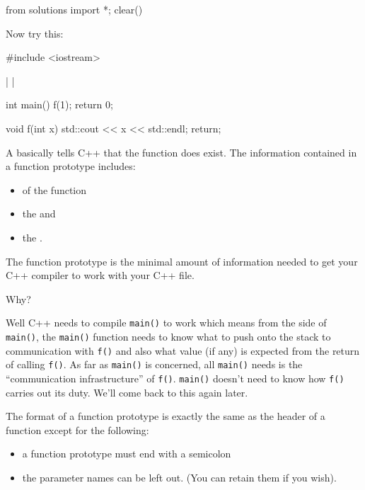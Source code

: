 \begin{python0}
from solutions import *; clear()
\end{python0}


Now try this:

\begin{consolethree}[escapeinside=||]
#include <iostream>

| |

int main()
{
    f(1);
    return 0;
}

void f(int x)
{
    std::cout << x << std::endl;
    return;
}
\end{consolethree}
A  basically tells C++ that the function does exist. The information contained in a function prototype includes:

\begin{itemize}
\item {} of the function
\item the  and
\item the .
\end{itemize}

The function prototype is the minimal amount of information needed to get your C++ compiler to work with your C++ file.

Why?

Well C++ needs to compile \texttt{main()} to work which means from the side of \texttt{main()}, the \texttt{main()} function needs to know what to push onto the stack to communication with \texttt{f()} and also what value (if any) is expected from the return of calling \texttt{f()}. As far as \texttt{main()} is concerned, all \texttt{main()} needs is the ``communication infrastructure'' of \texttt{f()}. \texttt{main()} doesn't need to know how \texttt{f()} carries out its duty. We'll come back to this again later.

The format of a function prototype is exactly the same as the header of a function except for the following:

\begin{itemize}
\item a function prototype must end with a semicolon
\item the parameter names can be left out. (You can retain them if you wish).
\end{itemize}

